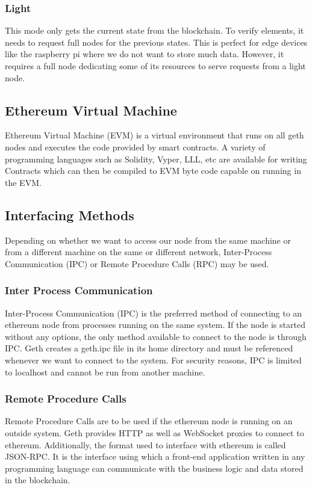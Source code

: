 \documentclass[11pt,openright]{report}
\begin{document}
\subsubsection{Light}
This mode only gets the current state from the blockchain. To verify elements, it needs to request full nodes for the previous states. This is perfect for edge devices like the raspberry pi where we do not want to store much data. However, it requires a full node dedicating some of its resources to serve requests from a light node.

\subsection{Ethereum Virtual Machine}
Ethereum Virtual Machine (EVM) is a virtual environment that runs on all geth nodes and executes the code provided by smart contracts. A variety of programming languages such as Solidity, Vyper, LLL, etc are available for writing Contracts which can then be compiled to EVM byte code capable on running in the EVM.

\subsection{Interfacing Methods}
Depending on whether we want to access our node from the same machine or from a different machine on the same or different network, Inter-Process Communication (IPC) or Remote Procedure Calls (RPC) may be used.

\subsubsection{Inter Process Communication}
Inter-Process Communication (IPC) is the preferred method of connecting to an ethereum node from processes running on the same system. If the node is started without any options, the only method available to connect to the node is through IPC. Geth creates a geth.ipc file in its home directory and must be referenced whenever we want to connect to the system. For security reasons, IPC is limited to localhost and cannot be run from another machine.

\subsubsection{Remote Procedure Calls}
Remote Procedure Calls are to be used if the ethereum node is running on an outside system. Geth provides HTTP as well as WebSocket proxies to connect to ethereum. Additionally, the format used to interface with ethereum is called JSON-RPC. It is the interface using which a front-end application written in any programming language can communicate with the business logic and data stored in the blockchain.
\end{document}
